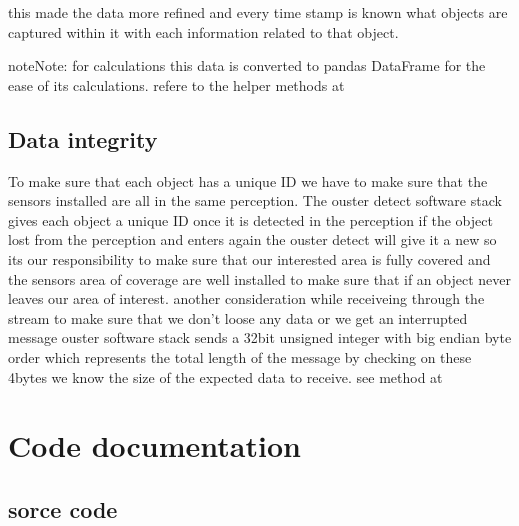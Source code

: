 \documentclass[letterpaper,10pt,english]{sphinxmanual}
\begin{document}
\sphinxAtStartPar
this made the data more refined and every time stamp is known what objects are captured within it with each information related to that object.

\begin{sphinxadmonition}{note}{Note:}
\sphinxAtStartPar
for calculations this data is converted to pandas DataFrame for the ease of its calculations. refere to the helper methods at {\hyperref[\detokenize{processing:processing-utils-ref}]{}}
\end{sphinxadmonition}


\section{Data integrity}
\label{\detokenize{projectdoc:data-integrity}}
\sphinxAtStartPar
To make sure that each object has a unique ID we have to make sure that the sensors installed are all in the same perception.
The ouster detect software stack gives each object a unique ID  once it is detected in the perception if the object lost from the perception and enters again
the ouster detect will give it a new  so its our responsibility to make sure that our interested area is fully covered and the sensors area of coverage are well
installed to make sure that if an object never leaves our area of interest. another consideration while receiveing through the stream to make sure that we don’t loose any
data or we get an interrupted message ouster software stack sends a 32\sphinxhyphen{}bit unsigned integer with big endian byte order which represents the total length of the message
by checking on these 4\sphinxhyphen{}bytes we know the size of the expected data to receive. see  method at {\hyperref[\detokenize{processing:processing-data-ref}]{}}

\sphinxstepscope


\chapter{Code documentation}
\label{\detokenize{codedoc:code-documentation}}\label{\detokenize{codedoc::doc}}

\section{sorce code}
\label{\detokenize{codedoc:sorce-code}}
\sphinxstepscope
\end{document}
